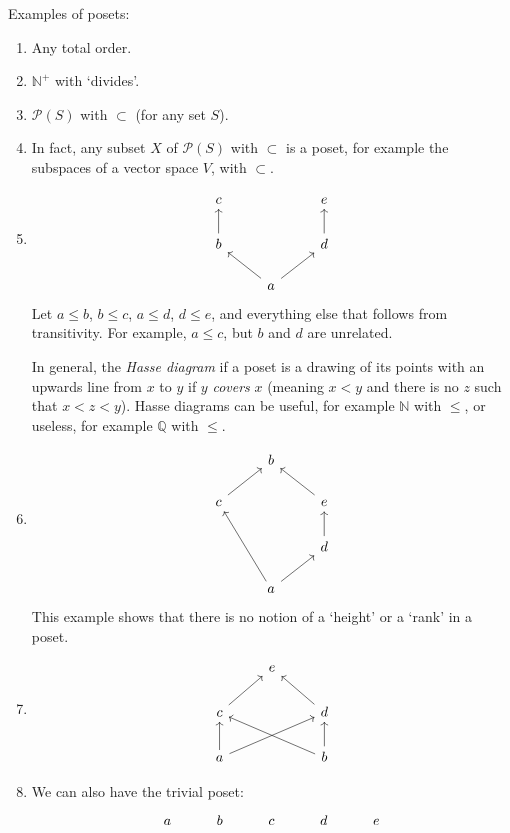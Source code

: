 \documentclass[12pt]{article}
\begin{document}
\begin{exbox}
	Examples of posets:
	\begin{enumerate}
		\item Any total order.
		\item $\mathbb{N}^{+}$ with `divides'.
		\item $\mathcal{P}(S)$ with $\subset$ (for any set $S$).
		\item In fact, any subset $X$ of $\mathcal{P}(S)$ with $\subset$ is a poset, for example the subspaces of a vector space $V$, with $\subset$.
		\item 
		\[
		\begin{tikzcd}
			c & & e \\
			b \arrow{u} & & d \arrow{u} \\
				    & a \arrow{lu} \arrow{ru} &
		\end{tikzcd}
		\] 
		Let $a \leq b$, $b \leq c$, $a \leq d$, $d \leq e$, and everything else that follows from transitivity. For example, $a \leq c$, but $b$ and $d$ are unrelated.

			In general, the \emph{Hasse diagram} if a poset is a drawing of its points with an upwards line from $x$ to $y$ if $y$ \emph{covers} $x$ (meaning $x < y$ and there is no $z$ such that $x < z < y$). Hasse diagrams can be useful, for example $\mathbb{N}$ with $\leq$, or useless, for example $\mathbb{Q}$ with $\leq$.
		\item
		\[
		\begin{tikzcd}
			& b & \\
			c \arrow{ru} & & e \arrow{lu} \\
				     & & d \arrow{u} \\
				     & a \arrow{ru} \arrow{luu} &
		\end{tikzcd}
		\]
		This example shows that there is no notion of a `height' or a `rank' in a poset.
		\item
		\[
		\begin{tikzcd}
			& e & \\
			c \arrow{ru} & & d \arrow{lu} \\
			a \arrow{u} \arrow{rru} & & b\arrow{u} \arrow{llu}
		\end{tikzcd}
		\]
		\item
			We can also have the trivial poset:
			\[
			\begin{tikzcd}
				a & b & c & d & e
			\end{tikzcd}
			\]
	\end{enumerate}
\end{exbox}
\end{document}

